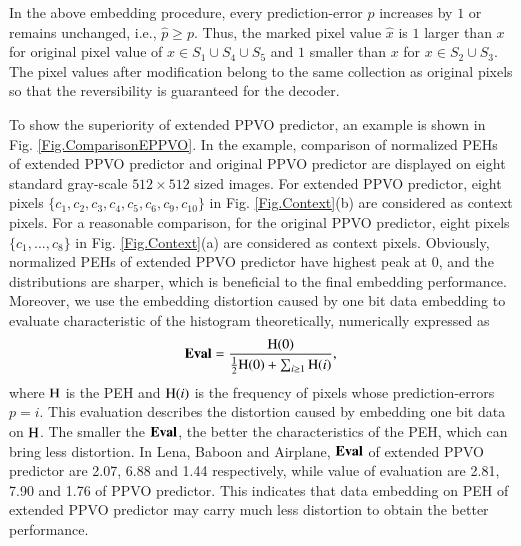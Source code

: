 \documentclass[review,3p,10pt,sort&compress]{elsarticle}
\begin{document}
In the above embedding procedure, every prediction-error $p$ increases by $1$ or remains unchanged, i.e., $\hat{p} \geq p$. 
Thus, the marked pixel value $\hat{x}$ is $1$ larger than $x$ for original pixel value of $x \in S_1 \cup S_4 \cup S_5$ and $1$ smaller than $x$ for $x \in S_2 \cup S_3$.
The pixel values after modification belong to the same collection as original pixels so that the reversibility is guaranteed for the decoder.

To show the superiority of extended PPVO predictor, an example is shown in Fig. \ref{Fig.ComparisonEPPVO}. In the example, comparison of normalized PEHs of extended PPVO predictor and original PPVO predictor are displayed on eight standard gray-scale $512 \times 512$ sized images. For extended PPVO predictor, eight pixels $\{c_{1}, c_{2}, c_{3}, c_{4}, c_{5}, c_{6}, c_{9}, c_{10}\}$ in Fig. \ref{Fig.Context}(b) are considered as context pixels. For a reasonable comparison, for the original PPVO predictor, eight pixels $\{c_{1}, ..., c_{8}\}$ in Fig. \ref{Fig.Context}(a) are considered as context pixels.
Obviously, normalized PEHs of extended PPVO predictor have highest peak at $0$, and the distributions are sharper, which is beneficial to the final embedding performance. Moreover, we use the embedding distortion caused by one bit data embedding to evaluate characteristic of the histogram theoretically, numerically expressed as
\begin{equation*}\label{eq:EvaluateHistogram}
{\rm \mathbf{Eval}} = \frac{{\rm H}(0)}{\frac{1}{2}{\rm H}(0)+ \sum_{i \geq 1}{\rm H}(i)},
\end{equation*}
where ${\rm H}$ is the PEH and ${\rm H}(i)$ is the frequency of pixels whose prediction-errors $p = i$. This evaluation describes the distortion caused by embedding one bit data on ${\rm H}$. The smaller the ${\rm \mathbf{Eval}}$, the better the characteristics of the PEH, which can bring less distortion. In Lena, Baboon and Airplane, ${\rm \mathbf{Eval}}$ of extended PPVO predictor are 2.07, 6.88 and 1.44 respectively, while value of evaluation are 2.81, 7.90 and 1.76 of PPVO predictor. This indicates that data embedding on PEH of extended PPVO predictor may carry much less distortion to obtain the better performance.
\end{document}
